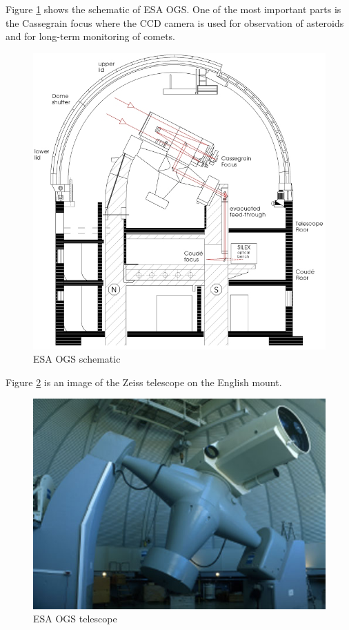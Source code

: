 	Figure \ref{fig:esaogs1} shows the schematic of ESA OGS. One of the most important parts is the Cassegrain focus where the CCD camera is used for observation of asteroids and for long-term monitoring of comets.


\begin{figure}[H]
  \includegraphics[width=\linewidth]{images/ESAOGS1}
  \caption{ESA OGS schematic}
  \label{fig:esaogs1}
\end{figure}

	Figure \ref{fig:esaogs2} is an image of the Zeiss telescope on the English mount.

\begin{figure}[H]
  \includegraphics[width=\linewidth]{images/ESAOGS2}
  \caption{ESA OGS telescope}
  \label{fig:esaogs2}
\end{figure}

